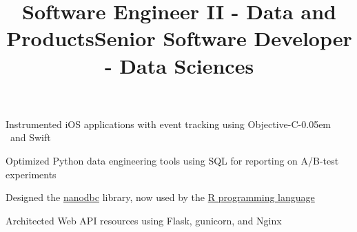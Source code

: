 \documentclass[12pt, line]{res}
\let\tempone\itemize
\let\temptwo\enditemize
\renewenvironment{itemize}{%
  \setlength{\topsep}{0pt}%
  \setlength{\partopsep}{0pt}%
  \tempone
  \renewcommand{\labelitemi}{$\bullet$}%
  \vspace{-0.25in}%
  \setlength{\itemsep}{3pt}%
  \setlength{\parsep}{0pt}%
}{%
  \temptwo
}
\newcommand{\Cpp}{C\kern-0.05em \raisebox{0.4ex}{\tiny\textbf{++}}}
\begin{document}
\begin{resume}
  \title{Software Engineer II - Data and Products}
  \begin{position}
    \begin{itemize}
      \item Instrumented iOS applications with event tracking using Objective-\Cpp~and Swift
      \item Optimized Python data engineering tools using SQL for reporting on A/B-test experiments %
    \end{itemize}
  \end{position}

  \title{Senior Software Developer - Data Sciences}
  \begin{position}
    \begin{itemize}
      \item Designed the \href{http://nanodbc.io}{nanodbc} library, now used by the \href{https://github.com/r-dbi/odbc}{R programming language}
      \item Architected Web API resources using Flask, gunicorn, and Nginx
    \end{itemize}
  \end{position}


\end{resume}
\end{document}

